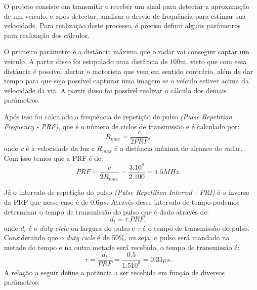 O projeto consiste em transmitir e receber um sinal para detectar a aproximação de um veículo, e após detectar, analisar o desvio de frequência para estimar sua velocidade. Para realização deste processo, é preciso definir alguns parâmetros para realização dos cálculos.

O primeiro parâmetro é a distância máxima que o radar vai conseguir captar um veículo. A partir disso foi estipulado uma distância de 100m, visto que com essa distância é possível alertar o motorista que vem em sentido contrário, além de dar tempo para que seja possível capturar uma imagem se o veículo estiver acima da velocidade da via. A partir disso foi possível realizar o cálculo dos demais parâmetros.

Após isso foi calculado a frequência de repetição de pulso \emph{ (Pulse Repetition Frequency - PRF)},  que é o número de ciclos de transmissão e é calculado por:
\begin{equation}\label{R_MAX}
    R_{max} =  \frac{c}{2PRF},
\end{equation}
onde \emph{c} é a velocidade da luz e $R_{max}$ é a distância máxima de alcance do radar. Com isso temos que a PRF é de:
\begin{equation}\label{PRF}
  PRF =  \frac{c}{2R_{max}} = \frac{3.10^8}{2.100} = 1.5MHz.
\end{equation}

Já o intervalo de repetição do pulso \emph{(Pulse Repetition Interval - PRI)} é o inverso da PRF que nesse caso é de $0.6\mu s$. Através desse intervalo de tempo podemos determinar o tempo de transmissão do pulso que é dado através de: 
\begin{equation}\label{duty}
  d_t = \tau . PRF,
\end{equation}
onde $d_t$ é o \emph{duty cicle} ou largura do pulso e $\tau$ é o tempo de transmissão do pulso. Considerando que o \emph{duty cicle} é de 50$\%$, ou seja, o pulso será mandado na metade do tempo e na outra metade será recebido, o tempo de transmissão é:
\begin{equation}\label{tal}
  \tau = \frac{d_t}{PRF} =  \frac{0.5}{1.510^6} = 0.33\mu s.
\end{equation}
A relação a seguir define a potência a ser recebida em função de diversos parâmetros:


